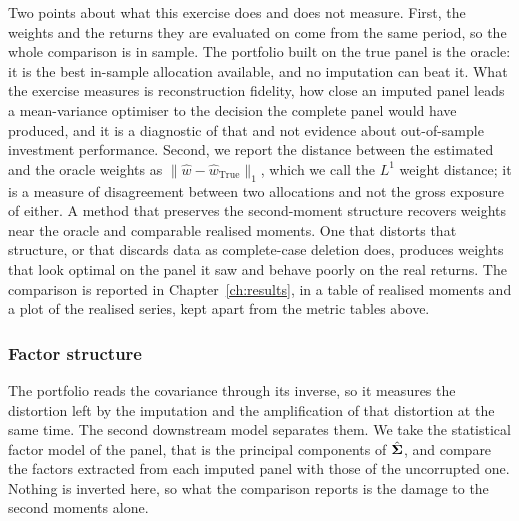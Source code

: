 Two points about what this exercise does and does not measure. First, the weights
and the returns they are evaluated on come from the same period, so the whole
comparison is in sample. The portfolio built on the true panel is the oracle: it
is the best in-sample allocation available, and no imputation can beat it. What
the exercise measures is reconstruction fidelity, how close an imputed panel
leads a mean-variance optimiser to the decision the complete panel would have
produced, and it is a diagnostic of that and not evidence about out-of-sample
investment performance. Second, we report the distance between the estimated and
the oracle weights as $\lVert \hat{w} - \hat{w}_{\text{True}} \rVert_1$, which we
call the $L^1$ weight distance; it is a measure of disagreement between two
allocations and not the gross exposure of either. A method that preserves the
second-moment structure recovers weights near the oracle and comparable realised
moments. One that distorts that structure, or that discards data as complete-case
deletion does, produces weights that look optimal on the panel it saw and behave
poorly on the real returns. The comparison is reported in
Chapter~\ref{ch:results}, in a table of realised moments and a plot of the
realised series, kept apart from the metric tables above.

\subsubsection{Factor structure}
\label{sec:factors}

The portfolio reads the covariance through its inverse, so it measures the
distortion left by the imputation and the amplification of that distortion at
the same time. The second downstream model separates them. We take the
statistical factor model of the panel, that is the principal components of
$\hat{\boldsymbol{\Sigma}}$, and compare the factors extracted from each imputed panel with
those of the uncorrupted one. Nothing is inverted here, so what the comparison
reports is the damage to the second moments alone.

